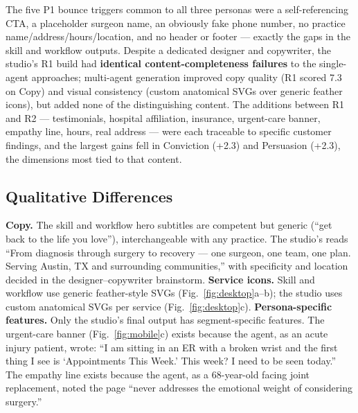 \documentclass[a4paper]{llncs}
\begin{document}
The five P1 bounce triggers common to all three personas were a
self-referencing CTA, a placeholder surgeon name, an obviously fake phone
number, no practice name/address/hours/location, and no header or footer ---
exactly the gaps in the skill and workflow outputs. Despite a dedicated
designer and copywriter, the studio's R1 build had \textbf{identical
content-completeness failures} to the single-agent approaches; multi-agent
generation improved copy quality (R1 scored 7.3 on Copy) and visual consistency
(custom anatomical SVGs over generic feather icons), but added none of the
distinguishing content. The additions between R1 and R2 --- testimonials,
hospital affiliation, insurance, urgent-care banner, empathy line, hours, real
address --- were each traceable to specific customer findings, and the largest
gains fell in Conviction (+2.3) and Persuasion (+2.3), the dimensions most tied
to that content.

\subsection{Qualitative Differences}

\textbf{Copy.} The skill and workflow hero subtitles are competent but generic
(``get back to the life you love''), interchangeable with any practice. The
studio's reads ``From diagnosis through surgery to recovery --- one surgeon,
one team, one plan. Serving Austin, TX and surrounding communities,'' with
specificity and location decided in the designer--copywriter brainstorm.
\textbf{Service icons.} Skill and workflow use generic feather-style SVGs
(Fig.~\ref{fig:desktop}a--b); the studio uses custom anatomical SVGs per
service (Fig.~\ref{fig:desktop}c). \textbf{Persona-specific features.} Only the
studio's final output has segment-specific features. The urgent-care banner
(Fig.~\ref{fig:mobile}c) exists because the agent, as an acute injury patient,
wrote: ``I am sitting in an ER with a broken wrist and the first thing I see is
`Appointments This Week.' This week? I need to be seen today.'' The empathy line
exists because the agent, as a 68-year-old facing joint replacement, noted the
page ``never addresses the emotional weight of considering surgery.''
\end{document}
